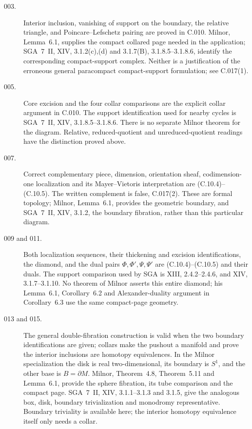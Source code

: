 \begin{description}
\item[003.] Interior inclusion, vanishing of support on the boundary,
the relative triangle, and Poincare--Lefschetz pairing are proved in
C.010. Milnor, Lemma~6.1, supplies the compact collared page needed
in the application; SGA~7~II, XIV, 3.1.2(c),(d) and 3.1.7(B),
3.1.8.5--3.1.8.6, identify the corresponding compact-support
complex. Neither is a justification of the erroneous general
paracompact compact-support formulation; see C.017(1).

\item[005.] Core excision and the four collar comparisons are the
explicit collar argument in C.010. The support identification used
for nearby cycles is SGA~7~II, XIV, 3.1.8.5--3.1.8.6. There is no
separate Milnor theorem for the diagram. Relative, reduced-quotient
and unreduced-quotient readings have the distinction proved above.

\item[007.] Correct complementary piece, dimension, orientation
sheaf, codimension-one localization and its Mayer--Vietoris
interpretation are (C.10.4)--(C.10.5). The written complement is
false, C.017(2). These are formal topology; Milnor, Lemma~6.1,
provides the geometric boundary, and SGA~7~II, XIV, 3.1.2,
the boundary fibration, rather than this particular diagram.

\item[009 and 011.] Both localization sequences, their thickening
and excision identifications, the diamond, and the dual pairs
$\Phi,\Phi',\Psi,\Psi'$ are (C.10.4)--(C.10.5) and their duals.
The support comparison used by SGA is XIII, 2.4.2--2.4.6, and XIV,
3.1.7--3.1.10. No theorem of Milnor asserts this entire diamond;
his Lemma~6.1, Corollary~6.2 and Alexander-duality argument in Corollary~6.3
use the same compact-page geometry.

\item[013 and 015.] The general double-fibration construction is
valid when the two boundary identifications are given; collars
make the pushout a manifold and prove the interior inclusions are
homotopy equivalences. In the Milnor specialization the disk is
real two-dimensional, its boundary is $S^1$, and the other base is
$B=\partial M$. Milnor, Theorem~4.8, Theorem~5.11 and Lemma~6.1,
provide the sphere fibration, its tube comparison and the compact
page. SGA~7~II, XIV, 3.1.1--3.1.3 and 3.1.5, give the analogous
box, disk, boundary trivialization and monodromy representative.
Boundary triviality is available here; the interior homotopy
equivalence itself only needs a collar.


\end{description}
